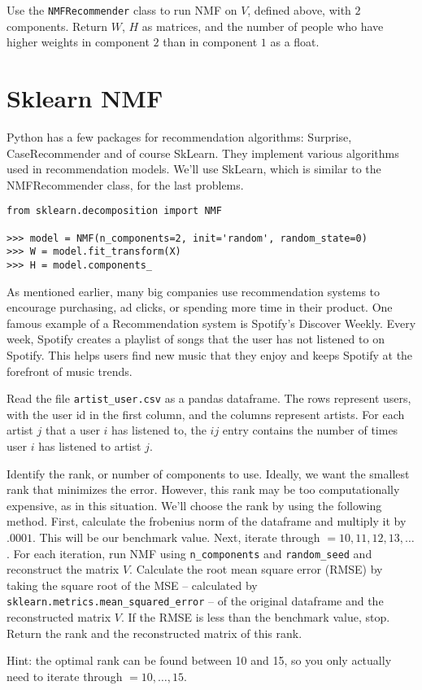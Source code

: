 \begin{problem}
Use the \texttt{NMFRecommender}  class to run NMF on $V$, defined above, with $2$ components.
Return $W$, $H$ as matrices, and the number of people who have higher weights in component $2$ than in component $1$ as a float.
\end{problem}

\section*{Sklearn NMF}
Python has a few packages for recommendation algorithms: Surprise, CaseRecommender and of course SkLearn.
They implement various algorithms used in recommendation models.
We'll use SkLearn, which is similar to the NMFRecommender class, for the last problems.


\begin{lstlisting}
from sklearn.decomposition import NMF

>>> model = NMF(n_components=2, init='random', random_state=0)
>>> W = model.fit_transform(X)
>>> H = model.components_
\end{lstlisting}

As mentioned earlier, many big companies use recommendation systems to encourage purchasing, ad clicks, or spending more time in their product.
One famous example of a Recommendation system is Spotify's Discover Weekly.
Every week, Spotify creates a playlist of songs that the user has not listened to on Spotify.
This helps users find new music that they enjoy and keeps Spotify at the forefront of music trends.

\begin{problem}
Read the file \texttt{artist\_user.csv} as a pandas dataframe.
The rows represent users, with the user id in the first column, and the columns represent artists.
For each artist $j$ that a user $i$ has listened to, the $ij$ entry contains the number of times user $i$ has listened to artist $j$.

Identify the rank, or number of components to use.
Ideally, we want the smallest rank that minimizes the error.
However, this rank may be too computationally expensive, as in this situation.
We'll choose the rank by using the following method. 
First, calculate the frobenius norm of the dataframe and multiply it by $.0001$.
This will be our benchmark value.
Next, iterate through $=10,11,12,13,\dots$.	
For each iteration, run NMF using \texttt{n\_components} and \texttt{random\_seed} and reconstruct the matrix $V$.
Calculate the root mean square error (RMSE) by taking the square root of the MSE -- calculated by \texttt{sklearn.metrics.mean\_squared\_error} -- of the original dataframe and the reconstructed matrix $V$.
If the RMSE is less than the benchmark value, stop. 
Return the rank and the reconstructed matrix of this rank.

\noindent Hint: the optimal rank can be found between 10 and 15, so you only actually need to iterate through $=10,\dots,15$.

\label{prob:music_nmf}
\end{problem}

